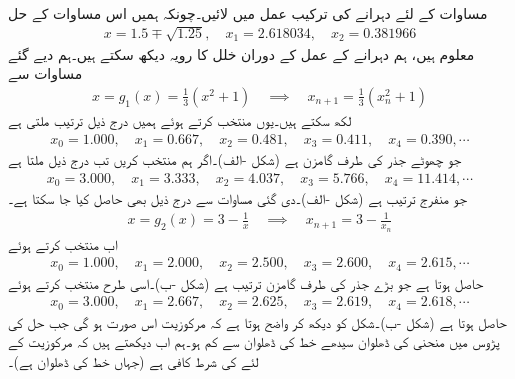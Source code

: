 \quad {}\\
مساوات  کے لئے دہرانے کی ترکیب عمل میں لائیں۔چونکہ ہمیں اس مساوات کے حل
\begin{align*}
x=1.5\mp\sqrt{1.25},\quad x_1=\num{2.618034},\quad x_2=\num{0.381966}
\end{align*}
معلوم ہیں، ہم دہرانے کے عمل کے دوران خلل کا رویہ دیکھ سکتے ہیں۔ہم دیے گئے مساوات سے
\begin{align}\label{مساوات_مثال_اعدادی_دہرانا_الف}
x=g_1(x)=\frac{1}{3}(x^2+1)\quad \implies \quad x_{n+1}=\frac{1}{3}(x_n^2+1)
\end{align}
لکھ سکتے ہیں۔یوں  منتخب کرتے ہوئے ہمیں درج ذیل ترتیب ملتی ہے
\begin{align*}
x_0=\num{1.000},\quad x_1=\num{0.667},\quad x_2=\num{0.481},\quad x_3=\num{0.411},\quad x_4=\num{0.390}, \cdots
\end{align*}
جو چھوٹے جذر کی طرف گامزن ہے (شکل -الف)۔اگر ہم  منتخب کریں تب درج ذیل ملتا ہے
\begin{align*}
x_0=\num{3.000},\quad x_1=\num{3.333},\quad x_2=\num{4.037},\quad x_3=\num{5,766},\quad x_4=\num{11.414}, \cdots
\end{align*}
جو منفرج ترتیب ہے (شکل -الف)۔دی گئی مساوات سے درج ذیل بھی حاصل کیا جا سکتا ہے۔
\begin{align}\label{مساوات_مثال_اعدادی_دہرانا_ب}
x=g_2(x)=3-\frac{1}{x}\quad \implies \quad x_{n+1}=3-\frac{1}{x_n}
\end{align}
اب  منتخب کرتے ہوئے
\begin{align*}
x_0=\num{1.000},\quad x_1=\num{2.000},\quad x_2=\num{2.500},\quad x_3=\num{2.600},\quad x_4=\num{2.615}, \cdots
\end{align*}
حاصل ہوتا ہے جو بڑے جذر کی طرف گامزن ترتیب ہے (شکل -ب)۔اسی طرح  منتخب کرتے ہوئے
\begin{align*}
x_0=\num{3.000},\quad x_1=\num{2.667},\quad x_2=\num{2.625},\quad x_3=\num{2.619},\quad x_4=\num{2.618}, \cdots
\end{align*}
حاصل ہوتا ہے (شکل -ب)۔شکل کو دیکھ کر واضح ہوتا ہے کہ مرکوزیت اس صورت ہو گی جب حل کی پڑوس میں منحنی  کی ڈھلوان سیدھے خط  کی ڈھلوان سے کم ہو۔ہم اب دیکھتے ہیں کہ مرکوزیت کے لئے   کی شرط کافی ہے (جہاں خط  کی ڈھلوان  ہے)۔
